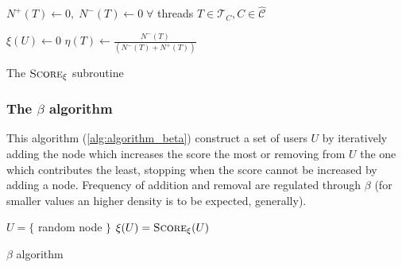 \begin{algorithm}
	\SetAlgoLined
	$N^{+} (T) \leftarrow 0, \; N^{-} (T) \leftarrow 0\; \forall $ threads $T
		\in \mathcal{T}_{C}, C \in \mathcal{\hat{C}}   $ \;


	$\xi(U) \leftarrow 0$ \;
	$\eta(T) \leftarrow\frac{N^{-}(T)}{(N^{-}(T) + N^{+} (T))}$ \;

	\caption{The $\textsc{Score}_{\xi}  $ subroutine}
	\label{alg:score_xi}
\end{algorithm}

\subsubsection{The $\beta$ algorithm}%
\label{ssub:the_beta_approach}

This algorithm (\autoref{alg:algorithm_beta}) construct a set of users $U$ by
iteratively adding the node which increases the score the most or removing from
$U$ the one which contributes the least, stopping when the score cannot be
increased by adding a node. Frequency of addition and removal are regulated
through $\beta $ (for smaller values an higher density is to be expected,
generally).

\begin{algorithm}
	\SetAlgoLined
	$U = \{$ random node $\}$\;
	$\xi(U) = \textsc{Score}_{\xi}(U)$ \;
	\caption{$\beta$ algorithm}
	\label{alg:algorithm_beta}
\end{algorithm}

